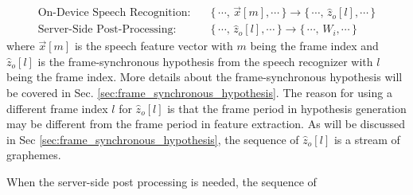 \documentclass{article}
\begin{document}
\begin{subequations}
  \begin{align}
    \text{On-Device Speech Recognition}   : 
        & \quad \{ \, \cdots ,\, \vec{x}[m],     \cdots \, \} \rightarrow  
                \{ \, \cdots ,\, \hat{z}_o[l],   \cdots \, \} \\
    \text{Server-Side Post-Processing} : 
        & \quad \{ \, \cdots ,\, \hat{z}_o[l],   \cdots \, \}  \rightarrow
                \{ \, \cdots ,\, W_i,   \cdots \, \}
  \end{align}
\end{subequations}
where $\vec{x}[m]$ is the speech feature vector with $m$ being the 
frame index and $\hat{z}_o[l]$ is the frame-synchronous hypothesis 
from the speech recognizer with $l$ being the frame index. More details
about the frame-synchronous hypothesis will be covered in Sec. 
\ref{sec:frame_synchronous_hypothesis}. The reason for using a different
frame index $l$ for $\hat{z}_o[l]$ is that the frame period in hypothesis
generation may be different from the frame period in feature extraction.
As will be discussed in Sec \ref{sec:frame_synchronous_hypothesis}, 
the sequence of $\hat{z}_o[l]$ is a stream of graphemes. 

When the server-side post processing is needed, the sequence of  
\end{document}
